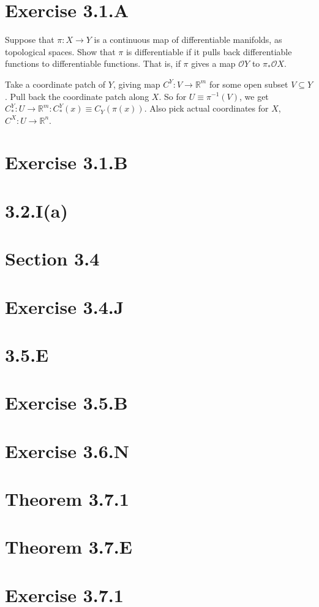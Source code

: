 \documentclass{book}
\newcommand{\R}{\ensuremath{\mathbb{R}}}
\renewcommand{\O}{\ensuremath{\mathcal{O}}}
\theoremstyle{definition}
\begin{document}
\section{Exercise 3.1.A}
Suppose that $\pi: X \rightarrow Y$ is a continuous map of differentiable manifolds,
as topological spaces. Show that $\pi$ is differentiable if it pulls back 
differentiable functions to differentiable functions. That is, if $\pi$ gives
a map $\O Y$ to $\pi_* \O X$.

Take a coordinate patch of $Y$, giving map $C^Y: V \rightarrow \R^m$ for some
open subset $V \subseteq Y$. Pull back the coordinate patch along $X$. So
for $U \equiv \pi^{-1}(V)$, we get 
$C^Y_*: U \rightarrow \R^m: C^Y_*(x) \equiv C_Y(\pi(x))$.
Also pick actual coordinates for $X$, $C^X: U \rightarrow \R^n$.

\section{Exercise 3.1.B}
\section{3.2.I(a)} 
\section{Section 3.4} 
\section{Exercise 3.4.J} 
\section{3.5.E} 
\section{Exercise 3.5.B} 
\section{Exercise 3.6.N}
\section{Theorem 3.7.1} 
\section{Theorem 3.7.E} 
\section{Exercise 3.7.1} 
\end{document}
